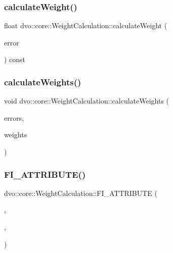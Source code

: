 \subsubsection{\texorpdfstring{calculate\+Weight()}{calculateWeight()}}
{\footnotesize\ttfamily float dvo\+::core\+::\+Weight\+Calculation\+::calculate\+Weight (\begin{DoxyParamCaption}\item[{const float}]{error }\end{DoxyParamCaption}) const}

\mbox{\label{classdvo_1_1core_1_1_weight_calculation_a13b02fbc5bd70393d7108ef7b6e1cf40}} 
\subsubsection{\texorpdfstring{calculate\+Weights()}{calculateWeights()}}
{\footnotesize\ttfamily void dvo\+::core\+::\+Weight\+Calculation\+::calculate\+Weights (\begin{DoxyParamCaption}\item[{const cv\+::\+Mat \&}]{errors,  }\item[{cv\+::\+Mat \&}]{weights }\end{DoxyParamCaption})}

\mbox{\label{classdvo_1_1core_1_1_weight_calculation_a6a12b73a656c81bfc0a97bcd88eb43a4}} 
\subsubsection{\texorpdfstring{F\+I\+\_\+\+A\+T\+T\+R\+I\+B\+U\+T\+E()}{FI\_ATTRIBUTE()}\hspace{0.1cm}{\footnotesize\ttfamily [1/3]}}
{\footnotesize\ttfamily dvo\+::core\+::\+Weight\+Calculation\+::\+F\+I\+\_\+\+A\+T\+T\+R\+I\+B\+U\+TE (\begin{DoxyParamCaption}\item[{\mbox{\hyperlink{classdvo_1_1core_1_1_weight_calculation}{Weight\+Calculation}}}]{,  }\item[{\mbox{\hyperlink{classdvo_1_1core_1_1_scale_estimator}{Scale\+Estimator}} $\ast$}]{,  }\item[{scale\+Estimator}]{ }\end{DoxyParamCaption})}

